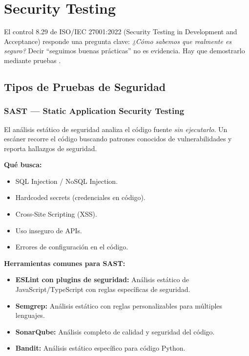 \section{Security Testing}
\label{sec:security-testing}

El control 8.29 de ISO/IEC 27001:2022 (Security Testing in Development and Acceptance) responde una pregunta clave: \textit{¿Cómo sabemos que realmente es seguro?} Decir ``seguimos buenas prácticas'' no es evidencia. Hay que demostrarlo mediante pruebas \cite{nist800218}.

\subsection{Tipos de Pruebas de Seguridad}

\subsubsection{SAST --- Static Application Security Testing}

El análisis estático de seguridad analiza el código fuente \textit{sin ejecutarlo}. Un escáner recorre el código buscando patrones conocidos de vulnerabilidades y reporta hallazgos de seguridad.

\textbf{Qué busca:}
\begin{itemize}
    \item SQL Injection / NoSQL Injection.
    \item Hardcoded secrets (credenciales en código).
    \item Cross-Site Scripting (XSS).
    \item Uso inseguro de APIs.
    \item Errores de configuración en el código.
\end{itemize}

\textbf{Herramientas comunes para SAST:}
\begin{itemize}
    \item \textbf{ESLint con plugins de seguridad:} Análisis estático de JavaScript/TypeScript con reglas específicas de seguridad.
    \item \textbf{Semgrep:} Análisis estático con reglas personalizables para múltiples lenguajes.
    \item \textbf{SonarQube:} Análisis completo de calidad y seguridad del código.
    \item \textbf{Bandit:} Análisis estático específico para código Python.
\end{itemize}

